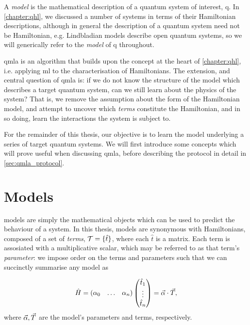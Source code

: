 \glsresetall

A \emph{model} is the mathematical description of a quantum system of interest, \gls{q}.
In \cref{chapter:qhl}, we discussed a number of systems in terms of their Hamiltonian descriptions,
    although in general the description of a quantum system need not be Hamiltonian, 
    e.g. Lindbladian models describe open quantum systems, 
    so we will generically refer to the \emph{\gls{model}} of \gls{q} throughout. 
\par 

\gls{qmla} is an algorithm that builds upon the concept at the heart of \cref{chapter:qhl},
    i.e. applying \gls{ml} to the characterisation of Hamiltonians.
The extension, and central question of \gls{qmla} is:
    if we do not know the structure of the model which describes a target quantum system, 
    can we still learn about the physics of the system?
That is, we remove the assumption about the form of the Hamiltonian model, 
    and attempt to uncover which \emph{\glspl{term}} constitute the Hamiltonian, 
    and in so doing, learn the interactions the system is subject to. 
\par 

For the remainder of this thesis, our objective is to learn the model underlying 
    a series of target quantum systems.
We will first introduce some concepts which will prove useful when discussing \gls{qmla}, 
    before describing the protocol in detail in \cref{sec:qmla_protocol}.


\section{Models}\label{sec:models}
\Glspl{model} are simply the mathematical objects which can be used to predict the behaviour of a system. 
In this thesis, \glspl{model} are synonymous with Hamiltonians,
    composed of a set of \emph{\glspl{term}}, $\mathcal{T} = \{ \hat{t} \}$, 
    where each $\hat{t}$ is a matrix. 
Each term is assosiated with a multiplicative scalar, which may be referred to as that term's \emph{parameter}: 
    we impose order on the terms and parameters such that we can succinctly summarise any model as 

\begin{align}
    \label{eqn:model}
    \begin{split}
        \hat{H} = \begin{matrix}(\alpha_0 & \dots & \alpha_n)\end{matrix} \left(\begin{matrix}\hat{t}_1 \\ \vdots \\ \hat{t}_n\end{matrix}\right) = \vec{\alpha} \cdot { \vec{T} },
    \end{split}
\end{align}
    where $\vec{\alpha}, { \vec{T} }$ are the model's parameters and terms, respectively.

